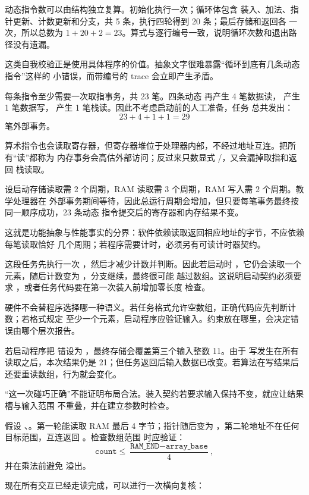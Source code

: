 动态指令数可以由结构独立复算。初始化执行一次；循环体包含
装入、加法、指针更新、计数更新和分支，共 5 条，执行四轮得到 20 条；最后存储和返回各
一次，所以总数为 \(1+20+2=23\)。算式与逐行编号一致，说明循环次数和退出路径没有遗漏。

这类自我校验正是使用具体程序的价值。抽象文字很难暴露“循环到底有几条动态指令”这样的
小错误，而带编号的 trace 会立即产生矛盾。


每条指令至少需要一次取指事务，共 23 笔。四条动态  再产生 4 笔数据读，
 产生 1 笔数据写， 产生 1 笔栈读。因此不考虑启动前的人工准备，任务
总共发出：
\[
23+4+1+1=29
\]
笔外部事务。

算术指令也会读取寄存器，但寄存器堆位于处理器内部，不经过地址互连。把所有“读”都称为
内存事务会高估外部访问；反过来只数显式 /，又会漏掉取指和返回
栈读取。


设启动存储读取需 2 个周期，RAM 读取需 3 个周期，RAM 写入需 2 个周期。教学处理器在
外部事务期间等待，因此总运行周期会增加，但只要每笔事务最终按同一顺序成功，23 条动态
指令提交后的寄存器和内存结果不变。

这就是功能抽象与性能事实的分界：软件依赖读取返回相应地址的字节，不应依赖每笔读取恰好
几个周期；若程序需要计时，必须另有可读计时器契约。



这段任务先执行一次 ，然后才减少计数并判断。因此若启动时
，它仍会读取一个元素，随后计数变为 ，分支继续，最终很可能
越过数组。这说明启动契约必须要求 ，或者任务代码要在第一次装入前增加零长度
检查。

硬件不会替程序选择哪一种语义。若任务格式允许空数组，正确代码应先判断计数；若格式规定
至少一个元素，启动程序应验证输入。约束放在哪里，会决定错误由哪个层次报告。


若启动程序把  错设为 ，最终存储会覆盖第三个输入整数 11。由于
写发生在所有读取之后，本次结果仍是 21；但任务返回后输入数据已改变。若算法在写结果后
还要重读数组，行为就会变化。

“这一次碰巧正确”不能证明布局合法。装入契约若要求输入保持不变，就应让结果槽与输入范围
不重叠，并在建立参数时检查。


假设 、。第一轮能读取 RAM 最后 4 字节；指针随后变为
，第二轮地址不在任何目标范围，互连返回 。检查数组范围
时应验证：
\[
\texttt{count}\le
\frac{\texttt{RAM\_END}-\texttt{array\_base}}{4},
\]
并在乘法前避免  溢出。


现在所有交互已经走读完成，可以进行一次横向复核：

